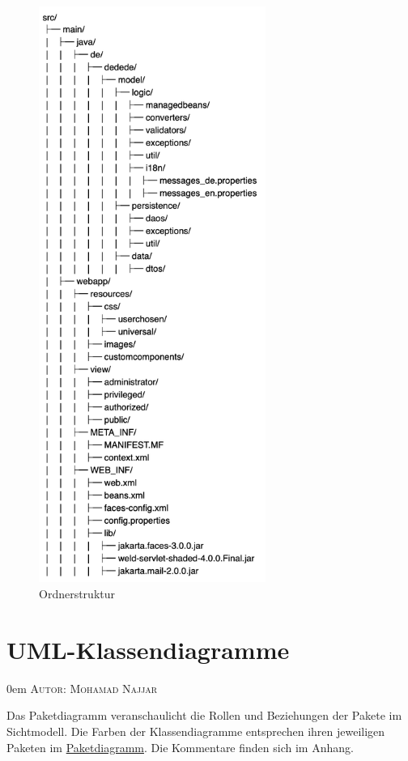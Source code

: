 \documentclass{article}
\makeatletter
\newcommand{\sectionauthor}[1]{
	{\parindent 0em \large \scshape Autor: #1 \par \nobreak \vspace*{1em}}
	\@afterheading
}
\makeatother
\begin{document}
\begin{figure}[H]	
\centering
\includegraphics[width = 20em]{FileStructure}
\caption{Ordnerstruktur}
\end{figure}

\section{UML-Klassendiagramme}
\sectionauthor{Mohamad Najjar}


Das Paketdiagramm veranschaulicht  die Rollen und Beziehungen der Pakete im Sichtmodell. Die Farben der Klassendiagramme entsprechen ihren jeweiligen Paketen im \hyperlink{Pakete}{Paketdiagramm}. Die Kommentare finden sich im Anhang.
\end{document}
